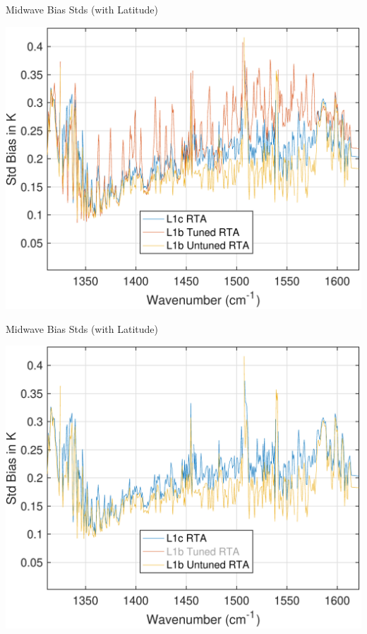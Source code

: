 \documentclass[10pt,t]{beamer}
\begin{document}
\begin{frame}[label={sec:orgfcad398}]{Midwave Bias Stds  (with Latitude)}
\begin{center}
\includegraphics[width=0.75\linewidth]{./Talk2/std_3rta_mw.pdf}
\end{center}
\end{frame}

\begin{frame}[label={sec:org6edc0cf}]{Midwave Bias Stds  (with Latitude)}
\addtocounter{framenumber}{-1}
  \begin{center}
  \includegraphics[width=0.75\linewidth]{./Talk2/std_3rta_mw_noL1btuning.pdf}
\end{center}
\end{frame}
\end{document}
